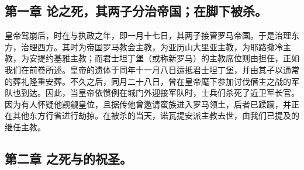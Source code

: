 
\subsection{第一章 论之死，其两子分治帝国；在脚下被杀。}

皇帝驾崩后，时在与执政之年，即一月十七日，其两子接管罗马帝国。于是治理东方，治理西方。其时为帝国罗马教会主教，为亚历山大里亚主教，为耶路撒冷主教，为安提约基雅主教；而君士坦丁堡（或称新罗马）的主教席位则由担任，正如我们在前卷所述。皇帝的遗体于同年十一月八日运抵君士坦丁堡，并由其子以通常的葬礼隆重安葬。不久之后，同月二十八日，曾在皇帝麾下参加讨伐僭主之战的军队也到达。因此，当皇帝依惯例在城门外迎接军队时，士兵们杀死了近卫军长官。因为有人怀疑他觊觎皇位，且据传他曾邀请蛮族进入罗马领土，后者已蹂躏，并正在其他东方行省进行劫掠。在被杀的当天，诺瓦提安派主教去世，由我们已提及的继任主教。\par


\subsection{第二章 之死与的祝圣。}

